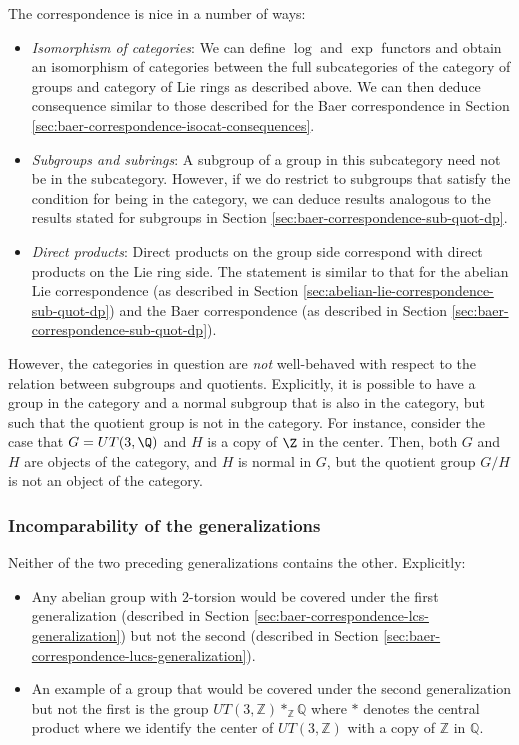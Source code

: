 \documentclass{ucetd}
\begin{document}
The correspondence is nice in a number of ways:

\begin{itemize}
\item {\em Isomorphism of categories}: We can define $\log$ and $\exp$
  functors and obtain an isomorphism of categories between the full
  subcategories of the category of groups and category of Lie rings as
  described above. We can then deduce consequence similar to those
  described for the Baer correspondence in Section
  \ref{sec:baer-correspondence-isocat-consequences}.
\item {\em Subgroups and subrings}: A subgroup of a group in this
  subcategory need not be in the subcategory. However, if we do
  restrict to subgroups that satisfy the condition for being in the
  category, we can deduce results analogous to the results stated for
  subgroups in Section \ref{sec:baer-correspondence-sub-quot-dp}.
\item {\em Direct products}: Direct products on the group side
  correspond with direct products on the Lie ring side. The statement
  is similar to that for the abelian Lie correspondence (as described
  in Section \ref{sec:abelian-lie-correspondence-sub-quot-dp}) and the
  Baer correspondence (as described in Section
  \ref{sec:baer-correspondence-sub-quot-dp}).
\end{itemize}

However, the categories in question are {\em not} well-behaved with
respect to the relation between subgroups and quotients. Explicitly,
it is possible to have a group in the category and a normal subgroup
that is also in the category, but such that the quotient group is not
in the category. For instance, consider the case that $G = UT(3,\Q)$
and $H$ is a copy of $\Z$ in the center. Then, both $G$ and $H$ are
objects of the category, and $H$ is normal in $G$, but the quotient
group $G/H$ is not an object of the category.

\subsubsection{Incomparability of the generalizations}

Neither of the two preceding generalizations contains the other. Explicitly:

\begin{itemize}
\item Any abelian group with $2$-torsion would be covered under the
  first generalization (described in Section
  \ref{sec:baer-correspondence-lcs-generalization}) but not the second
  (described in Section
  \ref{sec:baer-correspondence-lucs-generalization}).
\item An example of a group that would be covered under the second
  generalization but not the first is the group $UT(3,\mathbb{Z})
  *_{\mathbb{Z}} \mathbb{Q}$ where $*$ denotes the central product where
  we identify the center of $UT(3,\mathbb{Z})$ with a copy of
  $\mathbb{Z}$ in $\mathbb{Q}$.
\end{itemize}
\end{document}
